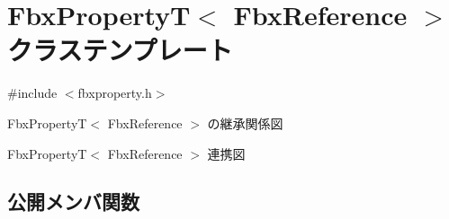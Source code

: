\hypertarget{class_fbx_property_t_3_01_fbx_reference_01_4}{}\section{Fbx\+PropertyT$<$ Fbx\+Reference $>$ クラステンプレート}
\label{class_fbx_property_t_3_01_fbx_reference_01_4}


{\ttfamily \#include $<$fbxproperty.\+h$>$}



Fbx\+PropertyT$<$ Fbx\+Reference $>$ の継承関係図


Fbx\+PropertyT$<$ Fbx\+Reference $>$ 連携図
\subsection*{公開メンバ関数}
